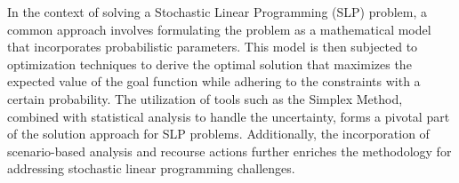 	\qquad In the context of solving a Stochastic Linear Programming (SLP) problem, a common approach involves formulating the problem as a mathematical model that incorporates probabilistic parameters. This model is then subjected to optimization techniques to derive the optimal solution that maximizes the expected value of the goal function while adhering to the constraints with a certain probability. The utilization of tools such as the Simplex Method, combined with statistical analysis to handle the uncertainty, forms a pivotal part of the solution approach for SLP problems. Additionally, the incorporation of scenario-based analysis and recourse actions further enriches the methodology for addressing stochastic linear programming challenges.                                                                                                                                                                                                                                                                                                                                                                                                                                                                                                 